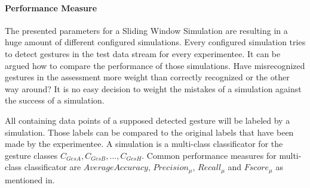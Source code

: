 \paragraph{Performance Measure} \label{performance_measure}
The presented parameters for a Sliding Window Simulation are resulting in a huge amount of different configured
simulations. Every configured simulation tries to detect gestures in the test data stream for every experimentee. It can
be argued how to compare the performance of those simulations. Have misrecognized gestures in the assessment more weight
than correctly recognized or the other way around? It is no easy decision to weight the mistakes of a simulation against
the success of a simulation.

All containing data points of a supposed detected gesture will be labeled by a simulation. Those labels can be compared
to the original labels that have been made by the experimentee. A simulation is a multi-class classificator for the
gesture classes $C_{GesA}, C_{GesB}, \dots, C_{GesH}$. Common performance measures for multi-class classificator are
$Average Accuracy$, $Precision_{\mu}$, $Recall_{\mu}$ and $Fscore_{\mu}$ as mentioned in\cite{sokolova2009systematic}.
